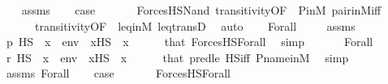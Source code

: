\begin{isabellebody}
\ \ \isamarkupfalse%
\ assms\isanewline
\ \ \isamarkupfalse%
\ {\isacharquery}{\kern0pt}case\ \isanewline
\ \ \ \ \isamarkupfalse%
\ ForcesHS{\isacharunderscore}{\kern0pt}Nand\ transitivity{\isacharbrackleft}{\kern0pt}OF\ {\isacharunderscore}{\kern0pt}\ P{\isacharunderscore}{\kern0pt}in{\isacharunderscore}{\kern0pt}M{\isacharbrackright}{\kern0pt}\ pair{\isacharunderscore}{\kern0pt}in{\isacharunderscore}{\kern0pt}M{\isacharunderscore}{\kern0pt}iff\ \isanewline
\ \ \ \ \ \ transitivity{\isacharbrackleft}{\kern0pt}OF\ {\isacharunderscore}{\kern0pt}\ leq{\isacharunderscore}{\kern0pt}in{\isacharunderscore}{\kern0pt}M{\isacharbrackright}{\kern0pt}\ leq{\isacharunderscore}{\kern0pt}transD\ \isamarkupfalse%
\ auto\isanewline
{}\isamarkupfalse%
\isanewline
\ \ \isamarkupfalse%
\ {\isacharparenleft}{\kern0pt}Forall\ {\isasymphi}{\isacharparenright}{\kern0pt}\isanewline
\ \ \isamarkupfalse%
\ assms\isanewline
\ \ \isamarkupfalse%
\ {\isachardoublequoteopen}p\ {\isasymtturnstile}HS\ {\isasymphi}\ {\isacharparenleft}{\kern0pt}{\isacharbrackleft}{\kern0pt}x{\isacharbrackright}{\kern0pt}\ {\isacharat}{\kern0pt}\ env{\isacharparenright}{\kern0pt}{\isachardoublequoteclose}\ \ {\isachardoublequoteopen}x{\isasymin}HS{\isachardoublequoteclose}\ \ x\isanewline
\ \ \ \ \isamarkupfalse%
\ that\ ForcesHS{\isacharunderscore}{\kern0pt}Forall\ \isamarkupfalse%
\ simp\isanewline
\ \ \isanewline
\ \ \isamarkupfalse%
\ Forall\ \isanewline
\ \ \isamarkupfalse%
\ {\isachardoublequoteopen}r\ {\isasymtturnstile}HS\ {\isasymphi}\ {\isacharparenleft}{\kern0pt}{\isacharbrackleft}{\kern0pt}x{\isacharbrackright}{\kern0pt}\ {\isacharat}{\kern0pt}\ env{\isacharparenright}{\kern0pt}{\isachardoublequoteclose}\ \ {\isachardoublequoteopen}x{\isasymin}HS{\isachardoublequoteclose}\ \ x\isanewline
\ \ \ \ \isamarkupfalse%
\ that\ pred{\isacharunderscore}{\kern0pt}le{}\ HS{\isacharunderscore}{\kern0pt}iff\ P{\isacharunderscore}{\kern0pt}name{\isacharunderscore}{\kern0pt}in{\isacharunderscore}{\kern0pt}M\ \isamarkupfalse%
\ simp\isanewline
\ \ \isamarkupfalse%
\ assms\ Forall\isanewline
\ \ \isamarkupfalse%
\ {\isacharquery}{\kern0pt}case\ \isanewline
\ \ \ \ \isamarkupfalse%
\ ForcesHS{\isacharunderscore}{\kern0pt}Forall\ \isamarkupfalse%

\end{isabellebody}
